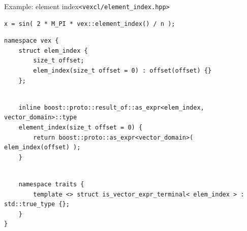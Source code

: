 \documentclass[@BEAMER_OPTIONS@]{beamer}
\newcommand{\code}[1]{\lstinline|#1|}
\begin{document}
\begin{frame}[fragile]{Example: element index}{\code{<vexcl/element_index.hpp>}}
    \begin{exampleblock}{}
        \begin{lstlisting}
x = sin( 2 * M_PI * vex::element_index() / n );
        \end{lstlisting}
    \end{exampleblock}
    \pause
    \begin{exampleblock}{}
        \begin{lstlisting}
namespace vex {
    struct elem_index {
        size_t offset;
        elem_index(size_t offset = 0) : offset(offset) {}
    };
        \end{lstlisting}
        \pause
        \begin{lstlisting}[firstnumber=last]

    inline boost::proto::result_of::as_expr<elem_index, vector_domain>::type
    element_index(size_t offset = 0) {
        return boost::proto::as_expr<vector_domain>( elem_index(offset) );
    }
        \end{lstlisting}
        \pause
        \begin{lstlisting}[firstnumber=last]

    namespace traits {
        template <> struct is_vector_expr_terminal< elem_index > : std::true_type {};
    }
}
        \end{lstlisting}
    \end{exampleblock}
\end{frame}
\end{document}
